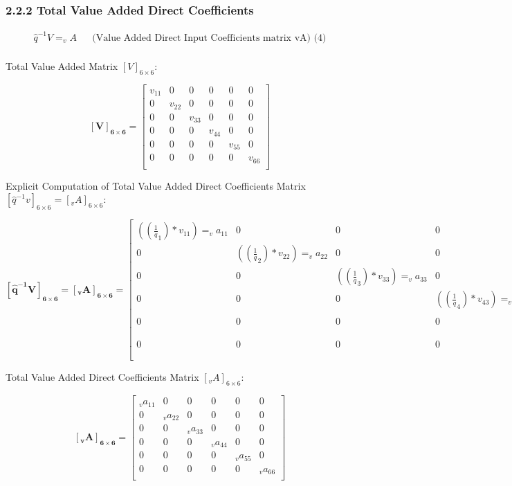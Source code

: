 \documentclass[
  letterpaper,
  DIV=11,
  numbers=noendperiod]{scrreprt}
\begin{document}
\subsubsection{2.2.2 Total Value Added Direct
Coefficients}\label{total-value-added-direct-coefficients}

\[
\begin{align}
    \hat{q}^{-1}V = _{v}A && \text{(Value Added Direct Input Coefficients matrix vA) (4)}\\
\end{align}
\]

Total Value Added Matrix \([V]_{6\times 6}\):

\[\mathbf {[V]_{6\times 6}} = \left[\begin{array}
{rrr}
v_{11} & 0 & 0 & 0 & 0 & 0 \\
0 & v_{22} & 0 & 0 & 0 & 0 \\
0 & 0 & v_{33} & 0 & 0 & 0 \\
0 & 0 & 0 & v_{44} & 0 & 0 \\
0 & 0 & 0 & 0 & v_{55} & 0 \\
0 & 0 & 0 & 0 & 0 & v_{66} \\
\end{array}\right]
\]

Explicit Computation of Total Value Added Direct Coefficients Matrix
\([\hat{q}^{-1}v]_{6\times 6}=[_{v}A]_{6\times 6}\):

\[\mathbf{[\hat{q}^{-1}V]_{6\times 6}=[_{v}A]_{6\times 6}} = \left[\begin{array}
{rrr}
((\frac{1} q_{1})*v_{11})=_{v}a_{11} & 0 & 0 & 0 & 0 & 0 \\
0 & ((\frac{1} q_{2})*v_{22})=_{v}a_{22} & 0 & 0 & 0 & 0 \\
0 & 0 & ((\frac{1} q_{3})*v_{33})=_{v}a_{33} & 0 & 0 & 0 \\
0 & 0 & 0 & ((\frac{1} q_{4})*v_{43})=_{v}a_{44} & 0 & 0 \\
0 & 0 & 0 & 0 & ((\frac{1} q_{5})*v_{55})=_{v}a_{55} & 0 \\
0 & 0 & 0 & 0 & 0 & ((\frac{1} q_{6})*v_{66})=_{v}a_{66} \\
\end{array}\right]
\]

Total Value Added Direct Coefficients Matrix \([_{v}A]_{6\times 6}\):

\[\mathbf{[_{v}A]_{6\times 6}} = \left[\begin{array}
{rrr}
_{v}a_{11} &0 & 0 & 0 & 0 & 0 \\
0 & _{v}a_{22} & 0 & 0 & 0 & 0 \\
0 & 0 & _{v}a_{33} & 0 & 0 & 0 \\
0 & 0 & 0 & _{v}a_{44} & 0 & 0 \\
0 & 0 & 0 & 0 & _{v}a_{55} & 0 \\
0 & 0 & 0 & 0 & 0 & _{v}a_{66} \\
\end{array}\right]
\]
\end{document}
